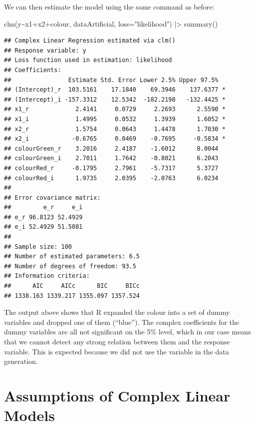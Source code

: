 \documentclass[
]{book}
\newenvironment{Shaded}{\begin{snugshade}}{\end{snugshade}}
\newcommand{\AttributeTok}[1]{\textcolor[rgb]{0.77,0.63,0.00}{#1}}
\newcommand{\FunctionTok}[1]{\textcolor[rgb]{0.00,0.00,0.00}{#1}}
\newcommand{\NormalTok}[1]{#1}
\newcommand{\SpecialCharTok}[1]{\textcolor[rgb]{0.00,0.00,0.00}{#1}}
\newcommand{\StringTok}[1]{\textcolor[rgb]{0.31,0.60,0.02}{#1}}
\begin{document}
We can then estimate the model using the same command as before:

\begin{Shaded}
\begin{Highlighting}[]
\FunctionTok{clm}\NormalTok{(y}\SpecialCharTok{\textasciitilde{}}\NormalTok{x1}\SpecialCharTok{+}\NormalTok{x2}\SpecialCharTok{+}\NormalTok{colour, dataArtificial, }\AttributeTok{loss=}\StringTok{"likelihood"}\NormalTok{) }\SpecialCharTok{|\textgreater{}}
    \FunctionTok{summary}\NormalTok{()}
\end{Highlighting}
\end{Shaded}

\begin{verbatim}
## Complex Linear Regression estimated via clm()
## Response variable: y
## Loss function used in estimation: likelihood
## Coefficients:
##                Estimate Std. Error Lower 2.5% Upper 97.5%  
## (Intercept)_r  103.5161    17.1840    69.3946    137.6377 *
## (Intercept)_i -157.3312    12.5342  -182.2198   -132.4425 *
## x1_r             2.4141     0.0729     2.2693      2.5590 *
## x1_i             1.4995     0.0532     1.3939      1.6052 *
## x2_r             1.5754     0.0643     1.4478      1.7030 *
## x2_i            -0.6765     0.0469    -0.7695     -0.5834 *
## colourGreen_r    3.2016     2.4187    -1.6012      8.0044  
## colourGreen_i    2.7011     1.7642    -0.8021      6.2043  
## colourRed_r     -0.1795     2.7961    -5.7317      5.3727  
## colourRed_i      1.9735     2.0395    -2.0763      6.0234  
## 
## Error covariance matrix:
##         e_r     e_i
## e_r 96.8123 52.4929
## e_i 52.4929 51.5081
## 
## Sample size: 100
## Number of estimated parameters: 6.5
## Number of degrees of freedom: 93.5
## Information criteria:
##      AIC     AICc      BIC     BICc 
## 1338.163 1339.217 1355.097 1357.524
\end{verbatim}

The output above shows that R expanded the colour into a set of dummy variables and dropped one of them (``blue''). The complex coefficients for the dummy variables are all not significant on the 5\% level, which in our case means that we cannot detect any strong relation between them and the response variable. This is expected because we did not use the variable in the data generation.

\hypertarget{assumptions}{%
\chapter{Assumptions of Complex Linear Models}\label{assumptions}}
\end{document}
